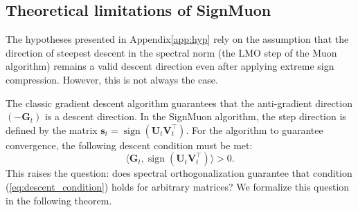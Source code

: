 \documentclass[letterpaper]{article} %
\begin{document}
\subsection{Theoretical limitations of SignMuon}

The hypotheses presented in Appendix\ref{app:hyp} rely on the assumption that the direction of steepest descent in the spectral norm (the LMO step of the Muon algorithm) remains a valid descent direction even after applying extreme sign compression. However, this is not always the case.

The classic gradient descent algorithm guarantees that the anti-gradient direction $(-\mathbf{G}_t)$ is a descent direction. In the SignMuon algorithm, the step direction is defined by the matrix $\mathbf{s}_t = \operatorname{sign}(\mathbf{U}_t \mathbf{V}_t^\top)$. For the algorithm to guarantee convergence, the following descent condition must be met:
\begin{equation}
\langle \mathbf{G}_t, \operatorname{sign}(\mathbf{U}_t \mathbf{V}_t^\top) \rangle > 0.
\label{eq:descent_condition}
\end{equation}
This raises the question: does spectral orthogonalization guarantee that condition (\ref{eq:descent_condition}) holds for arbitrary matrices? We formalize this question in the following theorem.
\end{document}
